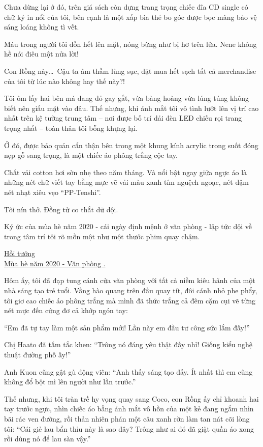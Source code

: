 \documentclass[../main.tex]{subfiles}
\begin{document}
Chưa dừng lại ở đó, trên giá sách còn dựng trang trọng chiếc đĩa CD single có chữ ký in nổi của tôi, bên cạnh là một xấp bìa thẻ bo góc được bọc màng bảo vệ sáng loáng không tì vết.

Máu trong người tôi dồn hết lên mặt, nóng bừng như bị hơ trên lửa. Nene không hề nói điêu một nửa lời!

Con Rồng này\dots\ Cậu ta âm thầm lùng sục, đặt mua hết sạch tất cả merchandise của tôi từ lúc nào không hay thế này?!

Tôi ôm lấy hai bên má đang đỏ gay gắt, vừa bàng hoàng vừa lúng túng không biết nên giấu mặt vào đâu. Thế nhưng, khi ánh mắt tôi vô tình lướt lên vị trí cao nhất trên kệ tường trung tâm -- nơi được bố trí dải đèn LED chiếu rọi trang trọng nhất -- toàn thân tôi bỗng khựng lại.

Ở đó, được bảo quản cẩn thận bên trong một khung kính acrylic trong suốt đóng nẹp gỗ sang trọng, là một chiếc áo phông trắng cộc tay.

Chất vải cotton hơi sờn nhẹ theo năm tháng. Và nổi bật ngay giữa ngực áo là những nét chữ viết tay bằng mực vẽ vải màu xanh tím nguệch ngoạc, nét đậm nét nhạt xiêu vẹo ``PP-Tenshi''.

Tôi nín thở. Đồng tử co thắt dữ dội.

Ký ức của mùa hè năm 2020 - cái ngày định mệnh ở văn phòng - lập tức dội về trong tâm trí tôi rõ mồn một như một thước phim quay chậm.

\ct

\begin{center}
  \uline{Hồi tưởng\\Mùa hè năm 2020 - Văn phòng \hll.}
\end{center}

Hôm ấy, tôi đã đạp tung cánh cửa văn phòng với tất cả niềm kiêu hãnh của một nhà sáng tạo trẻ tuổi. Vầng hào quang trên đầu quay tít, đôi cánh nhỏ phe phẩy, tôi giơ cao chiếc áo phông trắng mà mình đã thức trắng cả đêm cặm cụi vẽ từng nét mực đến cứng đơ cả khớp ngón tay:

``Em đã tự tay làm một sản phẩm mới! Lần này em đầu tư công sức lắm đấy!''

Chị Haato đã tấm tắc khen: ``Trông nó đáng yêu thật đấy nhỉ! Giống kiểu nghệ thuật đường phố ấy!''

Anh Kuon cũng gật gù động viên: ``Anh thấy sáng tạo đấy. Ít nhất thì em cũng không đổ bột mì lên người như lần trước.''

Thế nhưng, khi tôi tràn trề hy vọng quay sang Coco, con Rồng ấy chỉ khoanh hai tay trước ngực, nhìn chiếc áo bằng ánh mắt vô hồn của một kẻ đang ngắm nhìn bãi rác ven đường, rồi thản nhiên phán một câu xanh rờn làm tan nát cõi lòng tôi: ``Cái giẻ lau bẩn thỉu này là sao đây? Trông như ai đó đã giặt quần áo xong rồi dùng nó để lau sàn vậy.''
\end{document}
